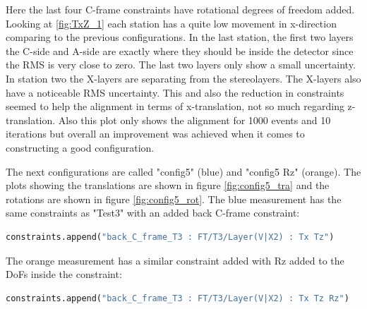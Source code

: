 Here the last four C-frame constraints have rotational degrees of freedom added.
Looking at \ref{fig:TxZ_1} each station has a quite low movement in x-direction comparing to the previous configurations. In the last station, the first two layers the C-side and A-side are exactly where they should be inside the detector since the RMS is very close to zero. The last two layers only show a small uncertainty. In station
two the X-layers are separating from the stereolayers. The X-layers also have a noticeable RMS uncertainty.
This and also the reduction in constraints seemed to help the alignment in terms of x-translation, not so much regarding z-translation. Also this plot only shows the alignment for 1000 events and 10 iterations but overall an improvement was achieved
when it comes to constructing a good configuration.

The next configurations are called "config5" (blue) and "config5 Rz" (orange). The plots showing the translations are shown in figure \ref{fig:config5_tra} and the rotations are shown in figure \ref{fig:config5_rot}.
The blue measurement has the same constraints as "Test3" with an added back C-frame constraint:
\begin{lstlisting}[language=Python]
  constraints.append("back_C_frame_T3 : FT/T3/Layer(V|X2) : Tx Tz")
\end{lstlisting}

The orange measurement has a similar constraint added with Rz added to the DoFs inside the constraint:
\begin{lstlisting}[language=Python]
  constraints.append("back_C_frame_T3 : FT/T3/Layer(V|X2) : Tx Tz Rz")
\end{lstlisting}

